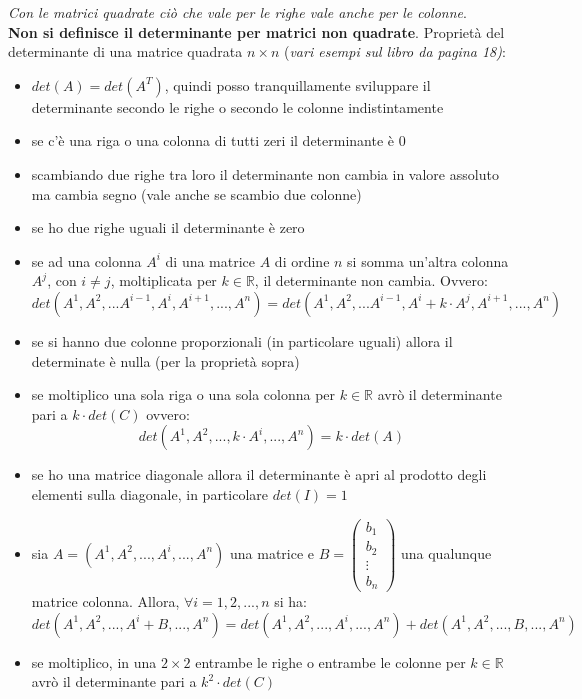 \documentclass[a4paper,12pt, oneside]{book}
\begin{document}
\textit{Con le matrici quadrate ciò che vale per le righe vale anche per le colonne}.\\
\textbf{Non si definisce il determinante per matrici non quadrate}.
\newpage
Proprietà del determinante di una matrice quadrata $n\times n$ (\textit{vari esempi sul libro da pagina 18)}:
\begin{itemize}
	\item $det(A)=det(A^T)$, quindi posso tranquillamente sviluppare il determinante secondo le righe o secondo le colonne indistintamente
	\item se c'è una riga o una colonna di tutti zeri il determinante è 0
	\item scambiando due righe tra loro il determinante non cambia in valore assoluto ma cambia segno (vale anche se scambio due colonne)
	\item se ho due righe uguali il determinante è zero
	\item se ad una colonna $A^i$ di una matrice $A$ di ordine $n$ si somma un'altra colonna $A^j$, con $i\neq j$, moltiplicata per $k\in \mathbb{R}$, il determinante non cambia. Ovvero:
	      $$det(A^1,A^2,...A^{i-1},A^i,A^{i+1},...,A^n)=det(A^1,A^2,...A^{i-1},A^i+k\cdot A^j,A^{i+1},...,A^n)$$
	\item se si hanno due colonne proporzionali (in particolare uguali) allora il determinate è nulla (per la proprietà sopra)
	\item se moltiplico una sola riga o una sola colonna per $k\in\mathbb{R}$ avrò il determinante pari a $k\cdot det(C)$ ovvero:
	      $$det(A^1,A^2,...,k\cdot A^i,...,A^n)=k\cdot det(A)$$
	\item se ho una matrice diagonale allora il determinante è apri al prodotto degli elementi sulla diagonale, in particolare $det(I)=1$
	\item sia $A=(A^1,A^2,...,A^i,...,A^n)$ una matrice e $
		      B=\left(\begin{matrix}
			      b_1    \\
			      b_2    \\
			      \vdots \\
			      b_n
		      \end{matrix}\right)
	      $ una qualunque matrice colonna. Allora, $\forall i=1,2,...,n$ si ha:
	      $$det(A^1,A^2,...,A^i+B,...,A^n)=det(A^1,A^2,..., A^i,...,A^n)+det(A^1,A^2,...,B,...,A^n)$$
	\item se moltiplico, in una $2\times 2$ entrambe le righe o entrambe le colonne per $k\in\mathbb{R}$ avrò il determinante pari a $k^2\cdot det(C)$

\end{itemize}
\end{document}
